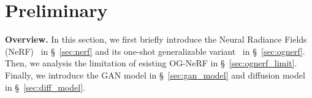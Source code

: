 
\section{\textbf{Preliminary}}
\noindent\textbf{Overview.} In this section, we first briefly introduce the Neural Radiance Fields (NeRF)~\cite{NeRF_mildenhall2020nerf} in \S~\ref{sec:nerf} and its one-shot generalizable variant~\cite{PixelNeRF_yu2021pixelnerf} in \S~\ref{sec:ognerf}. Then, we analysis the limitation of esisting OG-NeRF in \S~\ref{sec:ognerf_limit}. Finally, we introduce the GAN model in \S~\ref{sec:gan_model} and diffusion model in \S~\ref{sec:diff_model}.


\vspace{-2mm}
